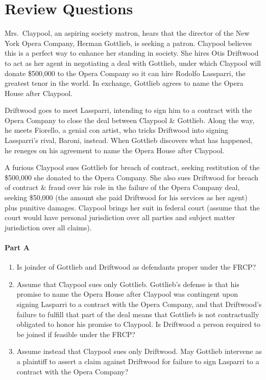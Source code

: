 \documentclass[11pt,letterpaper,twoside]{article}
\providecommand{\tightlist}{%
\setlength{\itemsep}{0em}\setlength{\parskip}{0em}\setlength{\itemindent}{0em}}
\begin{document}
\section{Review Questions}\label{review-questions}

Mrs.~Claypool, an aspiring society matron, hears that the director of
the New York Opera Company, Herman Gottlieb, is seeking a patron.
Claypool believes this is a perfect way to enhance her standing in
society. She hires Otis Driftwood to act as her agent in negotiating a
deal with Gottlieb, under which Claypool will donate \$500,000 to the
Opera Company so it can hire Rodolfo Lassparri, the greatest tenor in
the world. In exchange, Gottlieb agrees to name the Opera House after
Claypool.

Driftwood goes to meet Lassparri, intending to sign him to a contract
with the Opera Company to close the deal between Claypool \& Gottlieb.
Along the way, he meets Fiorello, a genial con artist, who tricks
Driftwood into signing Lassparri's rival, Baroni, instead. When Gottlieb
discovers what has happened, he reneges on his agreement to name the
Opera House after Claypool.

A furious Claypool sues Gottlieb for breach of contract, seeking
restitution of the \$500,000 she donated to the Opera Company. She also
sues Driftwood for breach of contract \& fraud over his role in the
failure of the Opera Company deal, seeking \$50,000 (the amount she paid
Driftwood for his services as her agent) plus punitive damages. Claypool
brings her suit in federal court (assume that the court would have
personal jurisdiction over all parties and subject matter jurisdiction
over all claims).

\paragraph{Part A}\label{part-a}

\begin{enumerate}
\def\labelenumi{\arabic{enumi}.}
\tightlist
\item
  Is joinder of Gottlieb and Driftwood as defendants proper under the
  FRCP?
\item
  Assume that Claypool sues only Gottlieb. Gottlieb's defense is that
  his promise to name the Opera House after Claypool was contingent upon
  signing Lasparri to a contract with the Opera Company, and that
  Driftwood's failure to fulfill that part of the deal means that
  Gottlieb is not contractually obligated to honor his promise to
  Claypool. Is Driftwood a person required to be joined if feasible
  under the FRCP?
\item
  Assume instead that Claypool sues only Driftwood. May Gottlieb
  intervene as a plaintiff to assert a claim against Driftwood for
  failure to sign Lasparri to a contract with the Opera Company?
\end{enumerate}
\end{document}
